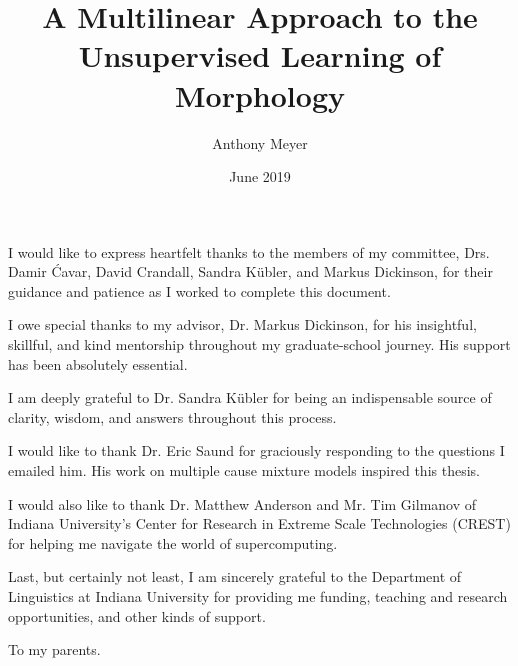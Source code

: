 \documentclass[showabstract,showacknowledgments,showdedication]{iuphd}
\title{A Multilinear Approach to the Unsupervised Learning of Morphology}
\author{Anthony Meyer}
\date{June 2019} %
\theoremstyle{remark}
\theoremstyle{remark}
\theoremstyle{remark}
\theoremstyle{remark}
\begin{document}
\maketitle
\acceptancepage

\copyrightpage



\begin{acknowledgments}
I would like to express heartfelt thanks to the members of my committee, Drs. Damir \'{C}avar, David Crandall, Sandra K\"{u}bler, and Markus Dickinson, for their guidance and patience as I worked to complete this document. 

I owe special thanks to my advisor, Dr. Markus Dickinson, for his insightful, skillful, and kind mentorship throughout my graduate-school journey. His support has been absolutely essential.

I am deeply grateful to Dr. Sandra K\"{u}bler for being an indispensable source of clarity, wisdom, and answers throughout this process.

I would like to thank Dr. Eric Saund for graciously responding to the questions I emailed him. His work on multiple cause mixture models inspired this thesis.

I would also like to thank Dr. Matthew Anderson and Mr. Tim Gilmanov of Indiana University’s Center for Research in Extreme Scale Technologies (CREST) for helping me navigate the world of supercomputing.

Last, but certainly not least, I am sincerely grateful to the Department of Linguistics at Indiana University for providing me funding, teaching and research opportunities, and other kinds of support.
\end{acknowledgments}


\begin{dedication}
To my parents.
\end{dedication}



\end{document}
